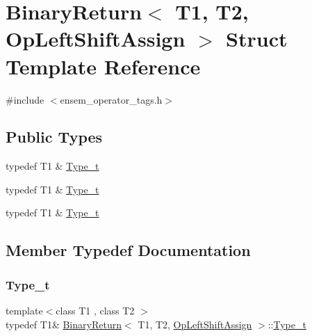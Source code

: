 \hypertarget{structBinaryReturn_3_01T1_00_01T2_00_01OpLeftShiftAssign_01_4}{}\section{Binary\+Return$<$ T1, T2, Op\+Left\+Shift\+Assign $>$ Struct Template Reference}
\label{structBinaryReturn_3_01T1_00_01T2_00_01OpLeftShiftAssign_01_4}


{\ttfamily \#include $<$ensem\+\_\+operator\+\_\+tags.\+h$>$}

\subsection*{Public Types}
\begin{DoxyCompactItemize}
\item 
typedef T1 \& \mbox{\hyperlink{structBinaryReturn_3_01T1_00_01T2_00_01OpLeftShiftAssign_01_4_a7d79a1ecfbc2faf0748a47701eee12af}{Type\+\_\+t}}
\item 
typedef T1 \& \mbox{\hyperlink{structBinaryReturn_3_01T1_00_01T2_00_01OpLeftShiftAssign_01_4_a7d79a1ecfbc2faf0748a47701eee12af}{Type\+\_\+t}}
\item 
typedef T1 \& \mbox{\hyperlink{structBinaryReturn_3_01T1_00_01T2_00_01OpLeftShiftAssign_01_4_a7d79a1ecfbc2faf0748a47701eee12af}{Type\+\_\+t}}
\end{DoxyCompactItemize}


\subsection{Member Typedef Documentation}
\mbox{\label{structBinaryReturn_3_01T1_00_01T2_00_01OpLeftShiftAssign_01_4_a7d79a1ecfbc2faf0748a47701eee12af}} 
\subsubsection{\texorpdfstring{Type\_t}{Type\_t}\hspace{0.1cm}{\footnotesize\ttfamily [1/3]}}
{\footnotesize\ttfamily template$<$class T1 , class T2 $>$ \\
typedef T1\& \mbox{\hyperlink{structBinaryReturn}{Binary\+Return}}$<$ T1, T2, \mbox{\hyperlink{structOpLeftShiftAssign}{Op\+Left\+Shift\+Assign}} $>$\+::\mbox{\hyperlink{structBinaryReturn_3_01T1_00_01T2_00_01OpLeftShiftAssign_01_4_a7d79a1ecfbc2faf0748a47701eee12af}{Type\+\_\+t}}}

